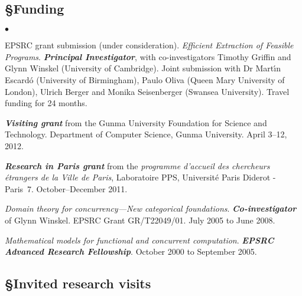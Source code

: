 \documentclass[11pt,twocolumn]{article}
\newenvironment{myitemize}
  {\begin{list}{$\bullet$}
  {\setlength{\topsep}{1pt}
   \setlength{\partopsep}{1pt}
   \setlength{\itemsep}{0pt}
   \setlength{\parsep}{0pt}
   \setlength{\leftmargin}{1em}
   \setlength{\labelwidth}{.5em}}}
  {\end{list}}
\begin{document}
\vspace*{-1.25mm}
\subsection*{\S\enspace\thinspace Funding}
\vspace*{-1mm}
\begin{myitemize}
\item
  EPSRC grant submission (under consideration).
  \emph{Efficient Extraction of Feasible Programs}.  \textbf{\em Principal
    Investigator}, with co-investigators Timothy Griffin and Glynn Winskel
  (University of Cambridge).  Joint submission with Dr Mart\'{\i}n
  Escard\'o (University of Birmingham), Paulo Oliva (Queen Mary University
  of London), Ulrich Berger and Monika Seisenberger (Swansea University).
  Travel funding for 24 months.

\item
  \textbf{\em Visiting grant} from the Gunma University Foundation for
  Science and Technology.  Department of Computer Science, Gunma
  University.  April 3--12, 2012.

\item
  \textbf{\em Research in Paris grant} from the \emph{programme d'accueil
    des chercheurs \'etrangers de la Ville de Paris}, Laboratoire PPS,
  Universit\'e Paris Diderot - Paris~7.  October--December 2011.

\item
  \emph{Domain theory for concurrency---New categorical foundations}.
  \textbf{\em Co-investigator} of Glynn Winskel.  EPSRC Grant
  GR/T22049/01.  July 2005 to June 2008.

\item
  \emph{Mathematical models for functional and concurrent computation}.
  \textbf{\em EPSRC Advanced Research Fellowship}. October 2000 to
  September 2005.  
\end{myitemize}

\vspace*{-1.25mm}
\subsection*{\S\enspace\thinspace Invited research visits}
\vspace*{-1mm}
\end{document}
